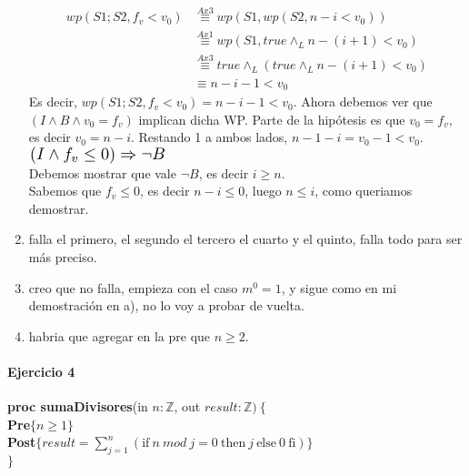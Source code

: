 \documentclass{article}
\begin{document}
\begin{enumerate}[label=\alph*)]
\begin{align*}
		wp(S1;S2,f_v<v_0)&\stackrel{Ax3}{\equiv}wp(S1,wp(S2,n-i<v_0))\\
			&\stackrel{Ax1}{\equiv}wp(S1,true\wedge_L n-(i+1)<v_0)\\
			&\stackrel{Ax3}{\equiv}true\wedge_L(true\wedge_L  n-(i+1)<v_0)\\
			&\equiv n-i-1<v_0
	\end{align*}
	Es decir, $wp(S1;S2,f_v<v_0)=n-i-1<v_0$. Ahora debemos ver que $(I\wedge B\wedge v_0=f_v)$ implican dicha WP. Parte de la 
	hipótesis es que $v_0=f_v$, es decir $v_0=n-i$. Restando 1 a ambos lados, $n-1-i=v_0-1<v_0$.\medskip \\
	$\scalebox{1.3}{$(I\wedge f_v\leq 0)\Rightarrow \neg B$}$\medskip\\
	Debemos mostrar que vale $\neg B$, es decir $i\geq n$.\\
	Sabemos que $f_v\leq 0$, es decir $n-i\leq 0$, luego $n\leq i$, como queriamos demostrar.
	
	\item falla el primero, el segundo el tercero el cuarto y el quinto, falla todo para ser más preciso.
	\item creo que no falla, empieza con el caso $m^0=1$, y sigue como en mi demostración en a), no lo
	voy a probar de vuelta.
	\item habria que agregar en la pre que $n\geq 2$.
\end{enumerate}

\paragraph{Ejercicio 4\\}
\noindent
\textbf{proc sumaDivisores}(in $n: \mathbb{Z}$, out $result: \mathbb{Z})\ \{$\smallskip \\
\hspace*{6mm}\textbf{Pre}$\{ n\geq 1 \}$\\
\hspace*{6mm}\textbf{Post}$\{ result=\sum_{j=1}^{n}(\textrm{if}\ n\ mod\ j=0\ \textrm{then}\ j\ \textrm{else}\ 0\ \textrm{fi})\}$\\
$\}$\medskip\\
\end{document}
